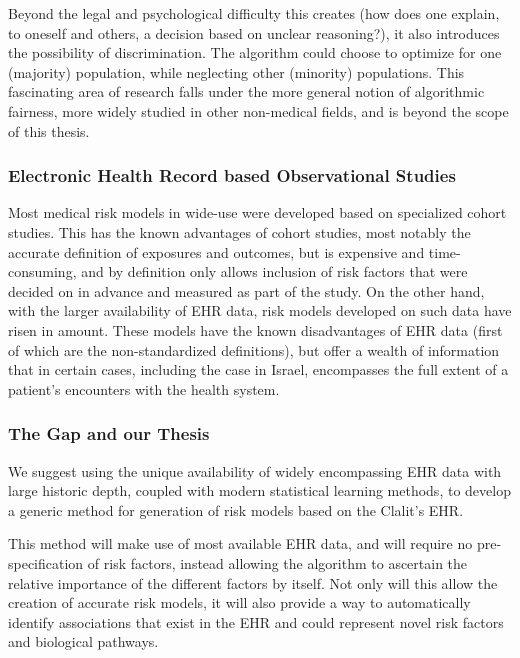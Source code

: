 \documentclass[a4paper,12pt]{article}
\begin{document}
			Beyond the legal and psychological difficulty this creates (how does one explain, to oneself and others, a decision based on unclear reasoning?), it also introduces the possibility of discrimination. The algorithm could choose to optimize for one (majority) population, while neglecting other (minority) populations\cite{Hebert-Johnson2017}. This fascinating area of research falls under the more general notion of algorithmic fairness, more widely studied in other non-medical fields\cite{Corbett-Davies2017}, and is beyond the scope of this thesis.
			
			\subsubsection{Electronic Health Record based Observational Studies}
		
			Most medical risk models in wide-use were developed based on specialized cohort studies\cite{Goldstein2016}. This has the known advantages of cohort studies, most notably the accurate definition of exposures and outcomes, but is expensive and time-consuming, and by definition only allows inclusion of risk factors that were decided on in advance and measured as part of the study. On the other hand, with the larger availability of EHR data, risk models developed on such data have risen in amount. These models have the known disadvantages of EHR data (first of which are the non-standardized definitions), but offer a wealth of information that in certain cases, including the case in Israel\cite{Lovis2015}, encompasses the full extent of a patient's encounters with the health system\cite{Goldstein2017}.
			
			\subsubsection{The Gap and our Thesis}
			
			We suggest using the unique availability of widely encompassing EHR data with large historic depth, coupled with modern statistical learning methods, to develop a generic method for generation of risk models based on the Clalit's EHR.
			
			This method will make use of most available EHR data, and will require no pre-specification of risk factors, instead allowing the algorithm to ascertain the relative importance of the different factors by itself. Not only will this allow the creation of accurate risk models, it will also provide a way to automatically identify associations that exist in the EHR and could represent novel risk factors and biological pathways.
			
\end{document}
